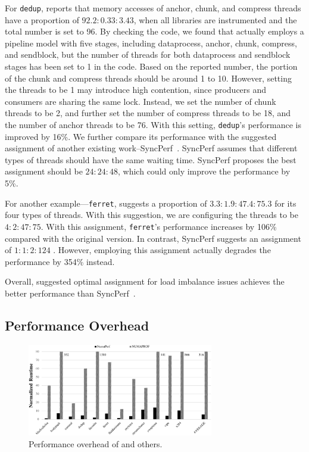 For \texttt{dedup}, \NP{} reports that memory accesses of anchor, chunk, and compress threads have a proportion of $92.2:0.33:3.43$, when all libraries are instrumented and the total number is set to 96. By checking the code, we found that  actually employs a pipeline model with five stages, including  dataprocess, anchor, chunk,  compress, and sendblock, but the number of threads for both dataprocess and sendblock stages has been set to 1 in the code.  Based on the reported number, the portion of the chunk and compress threads should be around 1 to 10. However, setting the threads to be 1 may introduce high contention, since producers and consumers are sharing the same lock. Instead, we set the number of chunk threads to be 2, and further set the number of compress threads to be 18, and the number of anchor threads to be 76. 
With this setting, \texttt{dedup}'s performance is improved by 16\%. We further compare its performance with the suggested assignment of another existing work--SyncPerf~\cite{SyncPerf}. SyncPerf assumes that different types of threads should have the same waiting time. SyncPerf proposes the best assignment should be $24:24:48$, which could only improve the performance by 5\%. 

For another example---\texttt{ferret}, \NP{} suggests a proportion of $3.3 :1.9 :47.4 :75.3$ for its four types of threads. With this suggestion, we are configuring the threads to be $4 : 2 : 47 : 75$. With this assignment, \texttt{ferret}'s performance increases by 106\% compared with the original version. In contrast, SyncPerf suggests an assignment of $1:1:2:124$
. However, employing this assignment actually degrades the performance by 354\% instead. 

Overall, \NP{} suggested optimal assignment for load imbalance issues achieves the better performance than SyncPerf~\cite{SyncPerf}. 

\subsection{Performance Overhead}
\label{sec:performance}
\begin{figure}[!h]
    \centering
    \includegraphics[width=3.2in]{paper/figures/performance.pdf}
    \caption{Performance overhead of \NP{} and others.\label{fig:performance}}  
\end{figure}


